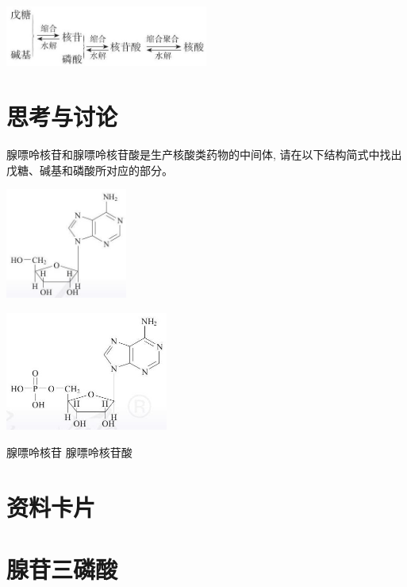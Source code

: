 \documentclass[10pt]{article}
\begin{document}
\begin{center}
\includegraphics[max width=0.5\textwidth]{images/0190efc5-b58a-7c43-bfb0-e0a030df9cfd_128_945849.jpg}
\end{center}

\section*{思考与讨论}

腺嘌呤核苷和腺嘌呤核苷酸是生产核酸类药物的中间体, 请在以下结构简式中找出戊糖、碱基和磷酸所对应的部分。

\begin{center}
\includegraphics[max width=0.3\textwidth]{images/0190efc5-b58a-7c43-bfb0-e0a030df9cfd_128_310614.jpg}
\end{center}

\begin{center}
\includegraphics[max width=0.4\textwidth]{images/0190efc5-b58a-7c43-bfb0-e0a030df9cfd_128_327027.jpg}
\end{center}

腺嘌呤核苷 腺嘌呤核苷酸

\section*{资料卡片}

\section*{腺苷三磷酸}
\end{document}
